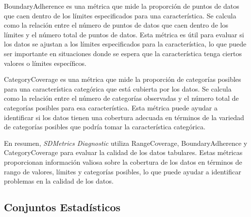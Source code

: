 BoundaryAdherence es una métrica que mide la proporción de puntos de datos que caen dentro de los límites especificados para una característica. Se calcula como la relación entre el número de puntos de datos que caen dentro de los límites y el número total de puntos de datos. Esta métrica es útil para evaluar si los datos se ajustan a los límites especificados para la característica, lo que puede ser importante en situaciones donde se espera que la característica tenga ciertos valores o límites específicos.

CategoryCoverage es una métrica que mide la proporción de categorías posibles para una característica categórica que está cubierta por los datos. Se calcula como la relación entre el número de categorías observadas y el número total de categorías posibles para esa característica. Esta métrica puede ayudar a identificar si los datos tienen una cobertura adecuada en términos de la variedad de categorías posibles que podría tomar la característica categórica.

En resumen, \emph{SDMetrics Diagnostic} utiliza RangeCoverage, BoundaryAdherence y CategoryCoverage para evaluar la calidad de los datos tabulares. Estas métricas proporcionan información valiosa sobre la cobertura de los datos en términos de rango de valores, límites y categorías posibles, lo que puede ayudar a identificar problemas en la calidad de los datos.




\subsection{Conjuntos Estadísticos}

